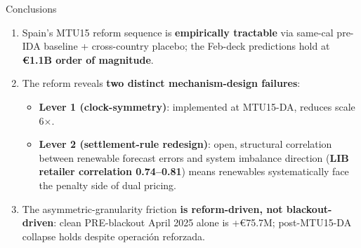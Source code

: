 \documentclass[aspectratio=169,10pt]{beamer}
\begin{document}
\begin{frame}{Conclusions}
\begin{enumerate}
  \item Spain's MTU15 reform sequence is \textbf{empirically tractable} via same-cal pre-IDA baseline + cross-country placebo; the Feb-deck \citet{ItoReguant} predictions hold at \textbf{€1.1B order of magnitude}.

  \item The reform reveals \textbf{two distinct mechanism-design failures}:
  \begin{itemize}
    \item \textbf{Lever 1 (clock-symmetry)}: implemented at MTU15-DA, reduces scale 6$\times$.
    \item \textbf{Lever 2 (settlement-rule redesign)}: open, structural correlation between renewable forecast errors and system imbalance direction (\textbf{LIB retailer correlation 0.74--0.81}) means renewables systematically face the penalty side of dual pricing.
  \end{itemize}

  \item The asymmetric-granularity friction \textbf{is reform-driven, not blackout-driven}: clean PRE-blackout April 2025 alone is +€75.7M; post-MTU15-DA collapse holds despite operación reforzada.
\end{enumerate}
\end{frame}
\end{document}
